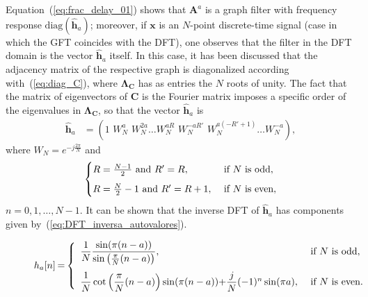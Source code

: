 Equation~(\ref{eq:frac_delay_01}) shows that $ \mathbf{A}^a $ is a graph filter with frequency response $ \mathrm{diag}(\widehat{\mathbf{h}}_a) $; moreover, if $ \mathbf{x} $ is an $N$-point discrete-time signal (case in which the GFT coincides with the DFT), one observes that the filter in the DFT domain is the vector $ \widehat{\mathbf{h}}_a $ itself. In this case, it has been discussed that the adjacency matrix of the respective graph is diagonalized according with~(\ref{eq:diag_C}), where $ \mathbf{\Lambda}_{\mathbf{C}} $ has as entries the $ N $ roots of unity. The fact that the matrix of eigenvectors of $ \mathbf{C} $ is the Fourier matrix imposes a specific order of the eigenvalues in $ \mathbf{\Lambda}_{\mathbf{C}} $, so that the vector $ \widehat{\mathbf{h}}_a$ is
\begin{align*}
\widehat{\mathbf{h}}_a &= (1 \,\, W_N^a \,\,W_N^{2a}\ldots W_N^{aR} \,\,W_N^{-aR'} \,\,W_N^{a(-R' + 1)}\ldots W_N^{-a}),
\end{align*}
where $ W_N = e^{-j \frac{2\pi}{N}} $ and
\begin{equation}
\begin{cases}
R = \frac{N-1}{2} \text{ and } R' = R, & \text{ if } N \text{ is odd},\vspace{0.2cm} \\
R = \frac{N}{2} - 1 \text{ and } R' = R+1, & \text{ if } N \text{ is even},
\end{cases}
\end{equation}
$n=0,1,\ldots,N-1$. It can be shown that the inverse DFT of $ \widehat{\mathbf{h}}_a $ has components given by~(\ref{eq:DFT_inversa_autovalores}).

\begin{figure}%
\begin{equation}\label{eq:DFT_inversa_autovalores}
h_a[n]\hspace{-0.03cm}=\hspace{-0.03cm}
\left\{\begin{array}{ll}
{\dfrac{1}{N}} \dfrac{\sin (\pi (n-a))}{\sin \left(\frac{\pi}{N} (n-a)\right)}, &\text{ if $N$ is odd},\vspace{0.25cm}\\
{\dfrac{1}{N} \cot \left(\dfrac{\pi}{N} (n-a)\right) \sin (\pi (n-a))}{+ \dfrac{j}{N} (-1)^n \sin (\pi a)}, &\text{ if } N \text{ is even}.
\end{array}\right.
\end{equation}
\end{figure}


